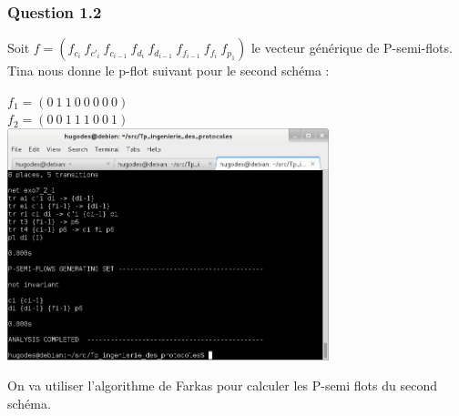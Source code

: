 \subsubsection{Question 1.2}

Soit $f=(f_{c_i}\ f_{c'_i}\ f_{c_{i-1}}\ f_{d_i}\ f_{d_{i-1}}\ f_{f_{i-1}}\ f_{f_i}\ f_{p_1})$ le vecteur générique de P-semi-flots.\\

Tina nous donne le p-flot suivant pour le second schéma :\\

\begin{center}

$f_1 = (0\ 1\ 1\ 0\ 0\ 0\ 0\ 0)$\\
$f_2 = (0\ 0\ 1\ 1\ 1\ 0\ 0\ 1)$\\

\includegraphics[width=0.7\textwidth]{exo7/tina_7_2.png}\\

\end{center}

On va utiliser l'algorithme de Farkas pour calculer les P-semi flots du second schéma.

